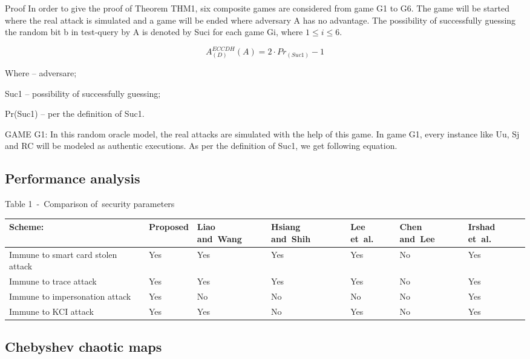 \documentclass[preprint]{oscmjournal}
\begin{document}
Proof In order to give the proof of Theorem THM1, six composite games are considered from game G1 to G6. The game will be started where the real attack is simulated and a game will be ended where adversary A has no advantage. The possibility of successfully guessing the random bit b in test-query by A is denoted by Suci for each game Gi, where $1 \leq i \leq 6$.
\centering

 \[
 A_{(D)}^{ECCDH}(A) = 2 \cdot Pr_{⁡(Suc1)}-1 \]

Where   – adversare;

Suc1 – possibility of successfully guessing;

Pr(Suc1) – per the definition of Suc1.

GAME G1: In this random oracle model, the real attacks are simulated with the help of this game. In game G1, every instance like Uu, Sj and RC will be modeled as authentic executions. As per the definition of Suc1, we get following equation.

\subsection{Performance analysis}

Table 1 - Comparison of security parameters

\begin{table}[ht]
\centering

\begin{tabular}{| l | l | l | l | l | l | l |}
\hline
Scheme: & Proposed & Liao and Wang & Hsiang and Shih & Lee et al. & Chen and Lee & Irshad et al. \\
\hline
Immune to smart card stolen attack & Yes & Yes & Yes & Yes & No & Yes \\
\hline
Immune to trace attack & Yes & Yes & Yes & Yes & No & Yes \\
\hline
Immune to impersonation attack & Yes & No & No & No & No & Yes \\
\hline
Immune to KCI attack & Yes & Yes & No & Yes & No & Yes \\
\hline

\end{tabular}

\end{table}

 

\subsection{Chebyshev chaotic maps}
\end{document}
